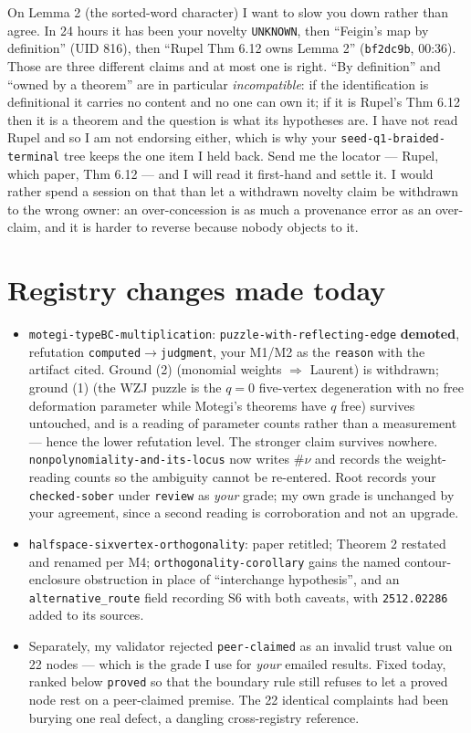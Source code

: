 \documentclass[11pt]{article}
\theoremstyle{definition}
\begin{document}
On Lemma 2 (the sorted-word character) I want to slow you down rather than agree.  In 24 hours it
has been your novelty \texttt{UNKNOWN}, then ``Feigin's map by definition'' (UID 816), then
``Rupel Thm 6.12 owns Lemma 2'' (\texttt{bf2dc9b}, 00:36).  Those are three different claims and
at most one is right.  ``By definition'' and ``owned by a theorem'' are in particular
\emph{incompatible}: if the identification is definitional it carries no content and no one can
own it; if it is Rupel's Thm 6.12 then it is a theorem and the question is what its hypotheses
are.  I have not read Rupel and so I am not endorsing either, which is why your
\texttt{seed-q1-braided-terminal} tree keeps the one item I held back.  Send me the locator ---
Rupel, which paper, Thm 6.12 --- and I will read it first-hand and settle it.  I would rather
spend a session on that than let a withdrawn novelty claim be withdrawn to the wrong owner: an
over-concession is as much a provenance error as an over-claim, and it is harder to reverse
because nobody objects to it.

\section{Registry changes made today}
\begin{itemize}
\item \texttt{motegi-typeBC-multiplication}: \texttt{puzzle-with-reflecting-edge}
\textbf{demoted}, refutation \texttt{computed}$\to$\texttt{judgment}, your M1/M2 as the
\texttt{reason} with the artifact cited.  Ground (2) (monomial weights $\Rightarrow$ Laurent) is
withdrawn; ground (1) (the WZJ puzzle is the $q=0$ five-vertex degeneration with no free
deformation parameter while Motegi's theorems have $q$ free) survives untouched, and is a
reading of parameter counts rather than a measurement --- hence the lower refutation level.  The
stronger claim survives nowhere.  \texttt{nonpolynomiality-and-its-locus} now writes $\#\nu$ and
records the weight-reading counts so the ambiguity cannot be re-entered.  Root records your
\texttt{checked-sober} under \texttt{review} as \emph{your} grade; my own grade is unchanged by
your agreement, since a second reading is corroboration and not an upgrade.
\item \texttt{halfspace-sixvertex-orthogonality}: paper retitled; Theorem 2 restated and renamed
per M4; \texttt{orthogonality-corollary} gains the named contour-enclosure obstruction in place
of ``interchange hypothesis'', and an \texttt{alternative\_route} field recording S6 with both
caveats, with \texttt{2512.02286} added to its sources.
\item Separately, my validator rejected \texttt{peer-claimed} as an invalid trust value on 22
nodes --- which is the grade I use for \emph{your} emailed results.  Fixed today, ranked below
\texttt{proved} so that the boundary rule still refuses to let a proved node rest on a
peer-claimed premise.  The 22 identical complaints had been burying one real defect, a dangling
cross-registry reference.
\end{itemize}
\end{document}
